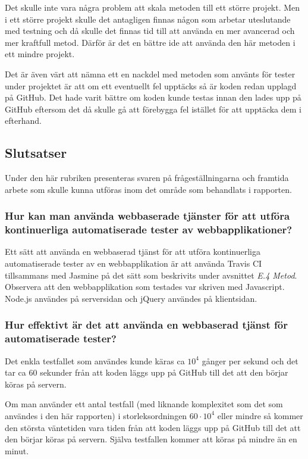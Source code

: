 Det skulle inte vara några problem att skala metoden till ett större projekt.
Men i ett större projekt skulle det antagligen finnas någon som arbetar
uteslutande med testning och då skulle det finnas tid till att använda en
mer avancerad och mer kraftfull metod. Därför är det en bättre ide att 
använda den här metoden i ett mindre projekt.

Det är även värt att nämna ett en nackdel med metoden som använts för tester
under projektet
är att om ett eventuellt fel upptäcks så är koden redan upplagd på GitHub.
Det hade varit bättre om koden kunde testas innan den lades upp på GitHub
eftersom det då skulle gå att förebygga fel istället för att upptäcka 
dem i efterhand.

\subsection{Slutsatser}
Under den här rubriken presenteras svaren på
frågeställningarna och framtida arbete som skulle
kunna utföras inom det område som behandlats i rapporten.

\subsubsection{Hur kan man använda webbaserade tjänster för
att utföra kontinuerliga automatiserade tester av webbapplikationer?}
Ett sätt att använda en webbaserad tjänst för att utföra kontinuerliga 
automatiserade tester av en webbapplikation är att använda  
Travis CI tillsammans med Jasmine på det sätt som beskrivits
under avsnittet \emph{E.4 Metod}. Observera att den webbapplikation som testades
var skriven med Javascript. Node.js användes på serversidan och 
jQuery användes på klientsidan.

\subsubsection{Hur effektivt är det att använda en webbaserad tjänst
för automatiserade tester?}
Det enkla testfallet som användes kunde käras ca $10^4$ gånger per sekund och
det tar ca 60 sekunder från att koden läggs upp på GitHub till det att den
börjar köras på servern.

Om man använder ett antal testfall (med liknande komplexitet som
det som användes i den här rapporten) i storleksordningen $60 \cdot 10^4$ eller
mindre så kommer den största väntetiden vara tiden från att koden
läggs upp på GitHub till det att den börjar köras på servern. Själva
testfallen kommer att köras på mindre än en minut.

